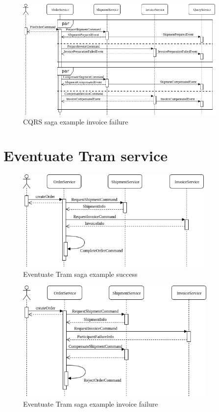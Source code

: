 \documentclass[oneside,
  digital, %
  table,   %
  lof,     %
  lot,     %
]{fithesis3}
\begin{document}
\hfill \break

\begin{figure}[h]
    \begin{center}
        \includegraphics[height=60mm]{images/sequence/invoiceFailSagaCQRS.png}
    \end{center}
    \caption{CQRS saga example invoice failure}
\end{figure}

\section{Eventuate Tram service}

\begin{figure}[h]
    \begin{center}
        \includegraphics[height=50mm]{images/sequence/validSagaTram.png}
    \end{center}
    \caption{Eventuate Tram saga example success}
\end{figure}

\hfill \break

\begin{figure}[h]
    \begin{center}
        \includegraphics[height=60mm]{images/sequence/invoiceFailSagaTram.png}
    \end{center}
    \caption{Eventuate Tram saga example invoice failure}
\end{figure}
\end{document}
